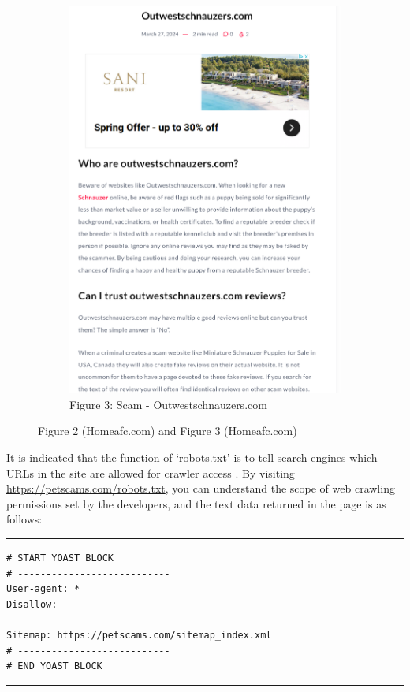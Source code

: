 \documentclass[ oneside,%
                    author={Cassie Qing Tang},
                    degree={BSc},
                     title={The Report for 3D Modelling of Queens Library \\ },
                    subtitle={ }]{dissertation}
\begin{document}
\begin{figure}[!htb]
\begin{subfigure}[b]{0.45\textwidth}
        \includegraphics[width=\linewidth]{pic/figure3.png}
        \caption{Figure 3: Scam - Outwestschnauzers.com}
        \label{fig:sub3}
    \end{subfigure}
    \caption{Figure 2 (Homeafc.com) and Figure 3 (Homeafc.com)}
    \label{fig:main2}
\end{figure}

It is indicated that the function of ‘robots.txt’ is to tell search engines which URLs in the site are allowed for crawler access \cite{noauthor_robotstxt_nodate}. By visiting \url{https://petscams.com/robots.txt}, you can understand the scope of web crawling permissions set by the developers, and the text data returned in the page is as follows:
\vspace{10pt}

\noindent\hrule  
\begin{verbatim}
# START YOAST BLOCK
# ---------------------------
User-agent: *
Disallow:

Sitemap: https://petscams.com/sitemap_index.xml
# ---------------------------
# END YOAST BLOCK
\end{verbatim}
\hrule  
\vspace{10pt}
\end{document}
